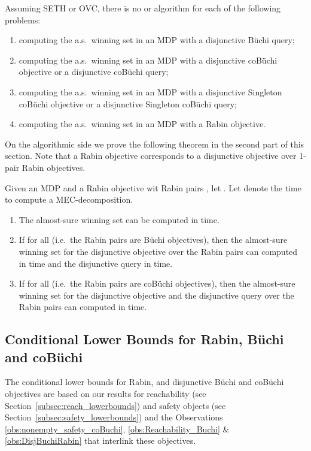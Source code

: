 \documentclass[11pt,letterpaper]{article}
\newcommand{\lu}{\textup{(}}
\newcommand{\ru}{\textup{)}\xspace}
\newcommand{\upbr}[1]{\lu #1\ru}
\begin{document}
\begin{theorem}
  Assuming SETH or OVC, there is no  or  algorithm for
  each of the following problems:
  \begin{enumerate}
   \item computing the a.s.~winning set in an MDP with a disjunctive Büchi query;
   \item computing the a.s.~winning set in an MDP with a disjunctive coBüchi objective or 
						 a disjunctive coBüchi query;
   \item computing the a.s.~winning set in an MDP with a disjunctive Singleton coBüchi objective or
   						 a disjunctive Singleton coBüchi query;
   \item computing the a.s.~winning set in an MDP with a Rabin objective.
  \end{enumerate}  
\end{theorem}

On the algorithmic side we prove the following theorem in the second part of this section.
Note that a Rabin objective corresponds to a disjunctive objective over 
1-pair Rabin objectives.
\begin{theorem}
	Given an MDP 
 	and a Rabin objective wit Rabin pairs ,
 	let .
  Let  denote the time to compute a MEC-decomposition.
  \begin{enumerate}
  	\item The almost-sure winning set  can be computed in 
  	 time.
  	\item If  for all  \upbr{i.e.\ the Rabin 
  	pairs are Büchi objectives},
  	then the almost-sure winning set for the disjunctive objective over the Rabin pairs 
  	can computed in  time and the disjunctive query in 
  	 time.
  	\item If  for all  \upbr{i.e.\ the Rabin 
  	pairs are coBüchi objectives}, then the 
  	almost-sure winning set for the disjunctive objective and the disjunctive
  	query over the Rabin pairs 
  	can computed in  time.
  \end{enumerate}
\end{theorem}

\subsection{Conditional Lower Bounds for Rabin, Büchi and coBüchi}

The conditional lower bounds for Rabin, and disjunctive  Büchi and coBüchi objectives are based 
on our results for reachability (see Section~\ref{subsec:reach_lowerbounds}) and safety objects 
(see Section~\ref{subsec:safety_lowerbounds}) and 
the Observations \ref{obs:nonempty_safety_coBuchi}, \ref{obs:Reachability_Buchi} \& \ref{obs:DisjBuchiRabin}
that interlink these objectives.
\end{document}
